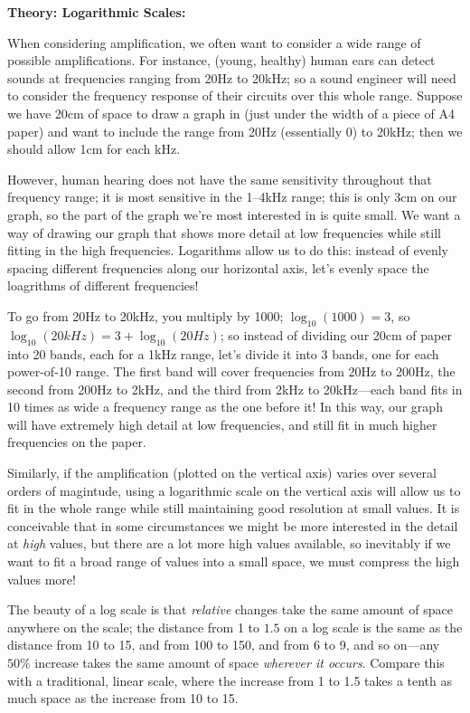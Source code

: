 \documentclass{article}
\begin{document}
\clearpage


\textbf{Theory: Logarithmic Scales:}\bigskip



When considering amplification, we often want to consider a wide range of possible amplifications. For instance, (young, healthy) human ears can detect sounds at frequencies ranging from 20Hz to 20kHz; so a sound engineer will need to consider the frequency response of their circuits over this whole range. Suppose we have 20cm of space to draw a graph in (just under the width of a piece of A4 paper) and want to include the range from 20Hz (essentially 0) to 20kHz; then we should allow 1cm for each kHz.

However, human hearing does not have the same sensitivity throughout that frequency range; it is most sensitive in the 1--4kHz range; this is only 3cm on our graph, so the part of the graph we're most interested in is quite small. We want a way of drawing our graph that shows more detail at low frequencies while still fitting in the high frequencies. Logarithms allow us to do this: instead of evenly spacing different frequencies along our horizontal axis, let's evenly space the loagrithms of different frequencies!

To go from 20Hz to 20kHz, you multiply by 1000; $\log_{10}(1000)=3$, so $\log_{10}(20kHz)=3+\log_{10}(20Hz)$; so instead of dividing our 20cm of paper into 20 bands, each for a 1kHz range, let's divide it into 3 bands, one for each power-of-10 range. The first band will cover frequencies from 20Hz to 200Hz, the second from 200Hz to 2kHz, and the third from 2kHz to 20kHz---each band fits in 10 times as wide a frequency range as the one before it! In this way, our graph will have extremely high detail at low frequencies, and still fit in much higher frequencies on the paper.

Similarly, if the amplification (plotted on the vertical axis) varies over several orders of magintude, using a logarithmic scale on the vertical axis will allow us to fit in the whole range while still maintaining good resolution at small values. It is conceivable that in some circumstances we might be more interested in the detail at \textit{high} values, but there are a lot more high values available, so inevitably if we want to fit a broad range of values into a small space, we must compress the high values more!

The beauty of a log scale is that \textit{relative} changes take the same amount of space anywhere on the scale; the distance from 1 to $1.5$ on a log scale is the same as the distance from 10 to 15, and from 100 to 150, and from 6 to 9, and so on---any $50\%$ increase takes the same amount of space \textit{wherever it occurs}. Compare this with a traditional, linear scale, where the increase from 1 to 1.5 takes a tenth as much space as the increase from 10 to 15.
\end{document}
